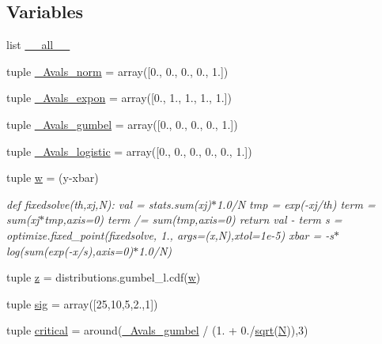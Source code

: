 \subsection*{Variables}
\begin{DoxyCompactItemize}
\item 
list \hyperlink{namespacescipy_1_1stats_1_1morestats_a4e1f06698420102c9803c6e61d1f61ca}{\+\_\+\+\_\+all\+\_\+\+\_\+}
\item 
tuple \hyperlink{namespacescipy_1_1stats_1_1morestats_a6685b0049404f34263a74f571743ea20}{\+\_\+\+Avals\+\_\+norm} = array(\mbox{[}0., 0., 0., 0., 1.\mbox{]})
\item 
tuple \hyperlink{namespacescipy_1_1stats_1_1morestats_a8667e874e3198d418cb27417b6948166}{\+\_\+\+Avals\+\_\+expon} = array(\mbox{[}0., 1., 1., 1., 1.\mbox{]})
\item 
tuple \hyperlink{namespacescipy_1_1stats_1_1morestats_abc2f7f99bb78a5601c155cceacd2e036}{\+\_\+\+Avals\+\_\+gumbel} = array(\mbox{[}0., 0., 0., 0., 1.\mbox{]})
\item 
tuple \hyperlink{namespacescipy_1_1stats_1_1morestats_a141be187dee0d0b2ed061081ceeb08f9}{\+\_\+\+Avals\+\_\+logistic} = array(\mbox{[}0., 0., 0., 0., 0., 1.\mbox{]})
\item 
tuple \hyperlink{namespacescipy_1_1stats_1_1morestats_a1ae693e1a4d206618c7a9de42f70e2ca}{w} = (y-\/xbar)
\begin{DoxyCompactList}\small\item\em def fixedsolve(th,xj,\+N)\+: val = stats.\+sum(xj)$\ast$1.0/\+N tmp = exp(-\/xj/th) term = sum(xj$\ast$tmp,axis=0) term /= sum(tmp,axis=0) return val -\/ term s = optimize.\+fixed\+\_\+point(fixedsolve, 1., args=(x,N),xtol=1e-\/5) xbar = -\/s$\ast$log(sum(exp(-\/x/s),axis=0)$\ast$1.0/\+N) \end{DoxyCompactList}\item 
tuple \hyperlink{namespacescipy_1_1stats_1_1morestats_aa8cc3d21cb73a29266cecf589cc91372}{z} = distributions.\+gumbel\+\_\+l.\+cdf(\hyperlink{namespacescipy_1_1stats_1_1morestats_a1ae693e1a4d206618c7a9de42f70e2ca}{w})
\item 
tuple \hyperlink{namespacescipy_1_1stats_1_1morestats_a9ec3d2a6dfa45c81743753af5649bb75}{sig} = array(\mbox{[}25,10,5,2.,1\mbox{]})
\item 
tuple \hyperlink{namespacescipy_1_1stats_1_1morestats_ad38f5eb205317368cf1cae4038cc91fc}{critical} = around(\hyperlink{namespacescipy_1_1stats_1_1morestats_abc2f7f99bb78a5601c155cceacd2e036}{\+\_\+\+Avals\+\_\+gumbel} / (1. + 0./\hyperlink{vecuops_8cc_ac9f82fdb8cd289615247f897852ee5f2}{sqrt}(\hyperlink{polmisc_8c_a0240ac851181b84ac374872dc5434ee4}{N})),3)

\end{DoxyCompactItemize}
